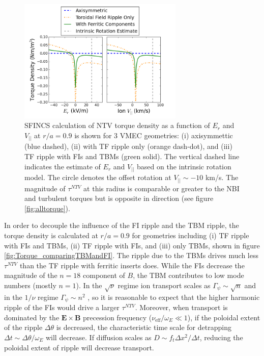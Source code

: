\documentclass{article}
\numberwithin{figure}{section}
\numberwithin{equation}{section}
\begin{document}
\begin{figure}[h!]
\centering
\includegraphics[width=0.7\textwidth]{Torque_ErandV.png}
\caption{\label{fig:Torque_ErandV} SFINCS calculation of NTV torque density as a function of $E_r$ and $V_{||}$ at $r/a = 0.9$ is shown for 3 VMEC geometries: (i) axisymmettic (blue dashed), (ii) with TF ripple only (orange dash-dot), and (iii) TF ripple with FIs and TBMs (green solid). The vertical dashed line indicates the estimate of $E_r$ and $V_{||}$ based on the intrinsic rotation model. The circle denotes the offset rotation at $V_{||} \sim -10$ km/s. The magnitude of $\tau^{NTV}$ at this radius is comparable or greater to the NBI and turbulent torques but is opposite in direction (see figure \ref{fig:alltorque}).}
\end{figure}

In order to decouple the influence of the FI ripple and the TBM ripple, the torque density is calculated at $r/a = 0.9$ for geometries including (i) TF ripple with FIs and TBMs, (ii) TF ripple with FIs, and (iii) only TBMs, shown in figure \ref{fig:Torque_comparingTBMandFI}. The ripple due to the TBMs drives much less $\tau^{NTV}$ than the TF ripple with ferritic inserts does.  While the FIs decrease the magnitude of the $n = 18$ component of $B$, the TBM contributes to low mode numbers (mostly $n = 1$). In the $\sqrt{\nu}$ regime ion transport scales as $\Gamma_{\psi} \sim \sqrt{n}$ and in the $1/\nu$ regime $\Gamma_{\psi} \sim n^2$ \cite{Shaing2010}, so it is reasonable to expect that the higher harmonic ripple of the FIs would drive a larger $\tau^{NTV}$. Moreover, when transport is dominated by the $\bm{E} \times \bm{B}$ precession frequency ($\nu_{\text{eff}}/\omega_E \ll 1$), if the poloidal extent of the ripple $\Delta \theta$ is decreased, the characteristic time scale for detrapping $\Delta t \sim \Delta \theta/ \omega_E$ will decrease. If diffusion scales as $D \sim f_t \Delta x^2/\Delta t$, reducing the poloidal extent of ripple will decrease transport. 
\end{document}

